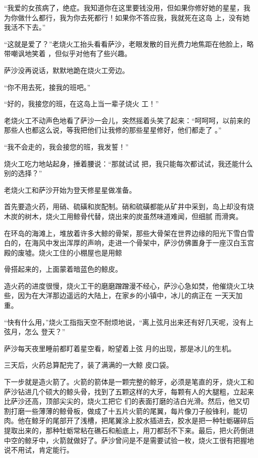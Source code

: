 \documentclass{article}
\begin{document}
“我爱的女孩病了，绝症。我知道你在这里要钱没用，但如果你修好她的星星，我为你做什么都行，我为你去死都行！如果你不答应我，我就死在这岛
上，没有她我活不下去。” 

“这就是爱了？”老烧火工抬头看看萨沙，老眼发散的目光费力地焦距在他脸上，略带嘲讽地笑着
，但似乎对他有了些兴趣。 


萨沙没再说话，默默地跪在烧火工旁边。 


“你不用去死，接我的班吧。” 

“好的，我接您的班，在这岛上当一辈子烧火
工！” 

\newpage

老烧火工不动声色地看了萨沙一会儿，突然摇着头笑了起来：“呵呵呵，以前来的那些人也都这么说，等我把他们让我修的那些星星修好，他们都走了
。” 


“我不会走的，我会接您的班，我发誓！” 

烧火工吃力地站起身，捶着腰说：“那就试试
把，我只能每次都试试，我还能什么别的选择？” 


老烧火工和萨沙开始为登天修星星做准备。 

首先要造火药，用硝、硫磺和炭配制。硝和硫磺都能从矿井中采到，岛上却没有烧木炭的树木，烧火工用鲸骨代替，烧出来的炭虽然味道难闻，但细腻
而滑爽。 

在环岛的海滩上，堆放着许多大鲸的骨架，那些大骨架在世界边缘的阳光下雪白雪白的，在海风中发出浑厚的声响，走进一个骨架中，萨沙仿佛置身于一座汉白玉宫殿的废墟。烧火工住的小棚屋也是用鲸
\newpage

骨搭起来的，上面蒙着暗蓝色的鲸皮。 

造火药的进度很慢，烧火工干的磨磨蹭蹭漫不经心，萨沙心急如焚，他催烧火工块些，因为在大洋那边遥远的大陆上，在家乡的小镇中，冰儿的病正在
一天天加重。 

“快有什么用，”烧火工指指天空不耐烦地说，“离上弦月出来还有好几天呢，没有上弦月，怎么
登天？” 

萨沙每天夜里睡前都盯着星空看，盼望着上弦
月的出现，那是冰儿的生机。 

三天后，火药总算配完了，装了满满的一大鲸
皮口袋。 

下一步就是造火箭了。火箭的箭体是一颗完整的鲸牙，必须是笔直的牙，烧火工和萨沙钻进几个硕大的鲸头骨，找到了五颗这样的大牙，每颗有人的大腿粗，立起来比萨沙还高，顶部尖尖的，烧火工把它
\newpage
们的表面打磨的洁白光滑。然后，他又切割打磨一些薄薄的鲸骨板，做成了十五片火箭的尾翼，每片像刀子般锋利，能切肉。他在鲸牙的尾部开了浅槽，把尾翼涂上胶水插进去，胶水是把一种牡蛎碾碎后提取出来的，那种牡蛎常粘在礁石和船底上，用刀都刮不下来。最后，把火药倒进中空的鲸牙中，火箭就做好了。萨沙曾问是不是需要试验一枚，烧火工很有把握地
说不用试，肯定能行。 
\end{document}
